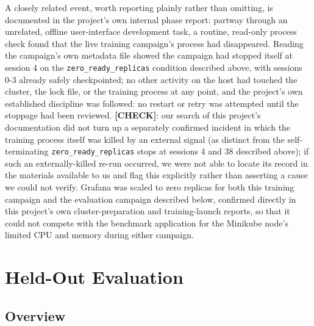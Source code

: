 A closely related event, worth reporting plainly rather than omitting, is
documented in the project's own internal phase report: partway through an
unrelated, offline user-interface development task, a routine, read-only
process check found that the live training campaign's process had
disappeared. Reading the campaign's own metadata file showed the campaign
had stopped itself at session 4 on the \texttt{zero\_\allowbreak ready\_\allowbreak replicas}
condition described above, with sessions 0-3 already safely checkpointed;
no other activity on the host had touched the cluster, the lock file, or
the training process at any point, and the project's own established
discipline was followed: no restart or retry was attempted until the
stoppage had been reviewed. \textbf{[CHECK]}: our search of this project's
documentation did not turn up a separately confirmed incident in which the
training process itself was killed by an external signal (as distinct from
the self-terminating \texttt{zero\_\allowbreak ready\_\allowbreak replicas} stops at sessions 4
and 38 described above); if such an externally-killed re-run occurred, we
were not able to locate its record in the materials available to us and
flag this explicitly rather than asserting a cause we could not verify.
Grafana was scaled to zero replicas for both this training campaign and the
evaluation campaign described below, confirmed directly in this project's
own cluster-preparation and training-launch reports, so that it could not
compete with the benchmark application for the Minikube node's limited CPU
and memory during either campaign.

\section{Held-Out Evaluation}
\label{sec:held-out-evaluation}

\subsection{Overview}

